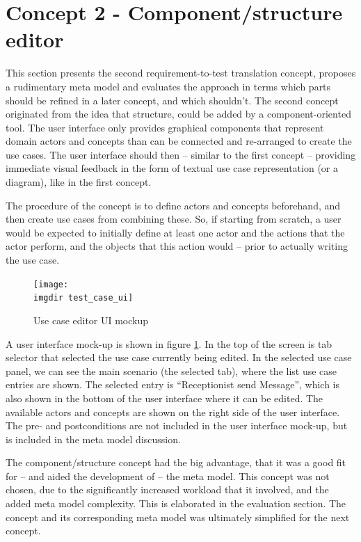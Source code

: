 \section{Concept 2 - Component/structure editor}
This section presents the second requirement-to-test translation concept, proposes a rudimentary meta model and evaluates the approach in terms which parts should be refined in a later concept, and which shouldn't.
The second concept originated from the idea that structure, could be added by a component-oriented tool. The user interface only provides graphical components that represent domain actors and concepts than can be connected and re-arranged to create the use cases. The user interface should then -- similar to the first concept -- providing immediate visual feedback in the form of textual use case representation (or a diagram), like in the first concept.\medskip

\noindent The procedure of the concept is to define actors and concepts beforehand, and then create use cases from combining these. So, if starting from scratch, a user would be expected to initially define at least one actor and the actions that the actor perform, and the objects that this action would -- prior to actually writing the use case.\medskip
\begin{figure}[!htbp]
\texttt{[image: \\imgdir test\_case\_ui]}
\centering
\caption{Use case editor UI mockup}
\label{fig:use_case_editor_mockup}
\end{figure}

\noindent A user interface mock-up is shown in figure \ref{fig:use_case_editor_mockup}. In the top of the screen is tab selector that selected the use case currently being edited. In the selected use case panel, we can see the main scenario (the selected tab), where the list use case entries are shown. The selected entry is ``Receptionist send Message'', which is also shown in the bottom of the user interface where it can be edited. The available actors and concepts are shown on the right side of the user interface. The pre- and postconditions are not included in the user interface mock-up, but is included in the meta model discussion.\medskip

\noindent The component/structure concept had the big advantage, that it was a good fit for -- and aided the development of -- the meta model. This concept was not chosen, due to the significantly increased workload that it involved, and the added meta model complexity. This is elaborated in the evaluation section. The concept and its corresponding meta model was ultimately simplified for the next concept.

